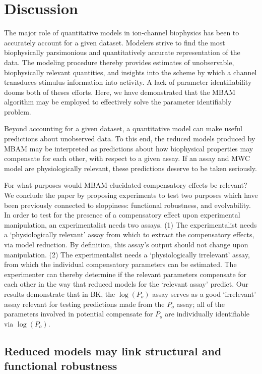 \documentclass[10pt]{amsart}
\newcommand\Po{P_o}
\newcommand\po{P_o}
\newcommand\lpo{\log(\Po)}
\begin{document}
\section{Discussion}

The major role of quantitative models in ion-channel biophysics has been to accurately account for a given dataset.  Modelers strive to find the most biophysically parsimonious and quantitatively accurate representation of the data.  The modeling procedure thereby provides estimates of unobservable, biophysically relevant quantities, and insights into the scheme by which a channel transduces stimulus information into activity.  A lack of parameter identifiability dooms both of theses efforts.  Here, we have demonstrated that the MBAM algorithm may be employed to effectively solve the parameter identifiably problem.

Beyond accounting for a given dataset, a quantitative model can make useful predictions about unobserved data.  To this end, the reduced models produced by MBAM may be interpreted as predictions about how biophysical properties may compensate for each other, with respect to a given assay.  If an assay and MWC model are physiologically relevant, these predictions deserve to be taken seriously.

For what purposes would MBAM-elucidated compensatory effects be relevant?  We conclude the paper by proposing experiments to test two purposes which have been previously connected to sloppiness: functional robustness, and evolvability.  In order to test for the presence of a compensatory effect upon experimental manipulation, an experimentalist needs two assays. (1) The experimentalist needs a `physiologically relevant' assay from which to extract the compensatory effects, via model reduction.  By definition, this assay's output should not change upon manipulation.  (2) The experimentalist needs a `physiologically irrelevant' assay, from which the individual compensatory parameters can be estimated.  The experimenter can thereby determine if the relevant parameters compensate for each other in the way that reduced models for the `relevant assay' predict.  Our results demonstrate that in BK, the $\lpo$ assay serves as a good `irrelevant' assay relevant for testing predictions made from the $\po$ assay; all of the parameters involved in potential compensate for $\po$ are individually identifiable via $\lpo.$ 

\subsection{Reduced models may link structural and functional robustness}
\end{document}
